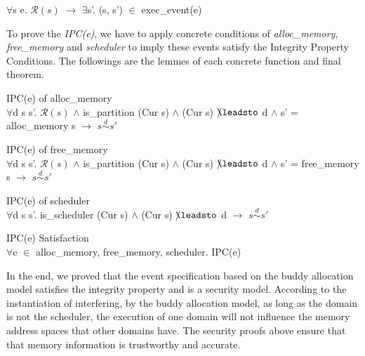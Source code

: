\documentclass[runningheads]{llncs}
\makeatletter
\newcommand{\equidom}[3]{{#1}\stackrel{#2}{\sim}{#3}}
\newcommand{\superimpose}[2]
	{{\ooalign{$#1\@firstoftwo#2$\cr\hfil$#1\@secondoftwo#2$\hfil\cr}}}
\newcommand{\ninterf}{\mathrel{\mathpalette\superimpose{{\slash}{\leadsto}}}}
\makeatother
\begin{document}
\begin{lemma}
$\forall$s e. $\mathcal{R}(s)$ $\longrightarrow$ $\exists$s'. (s, s') $\in$ exec\_event(e)
\end{lemma}

To prove the \emph{IPC(e)}, we have to apply concrete conditions of \emph{alloc\_memory}, \emph{free\_memory} and \emph{scheduler} to imply these events satisfy the Integrity Property Conditions. The followings are the lemmes of each concrete function and final theorem.

\begin{lemma} {IPC(e) of alloc\_memory} \\
$\forall$d s s'. $\mathcal{R}(s)$ $\wedge$ is\_partition (Cur s) $\wedge$ (Cur s) $\ninterf$ d $\wedge$ s' = alloc\_memory s $\longrightarrow$ $\equidom{s}{d}{s'}$
\end{lemma}

\begin{lemma} {IPC(e) of free\_memory} \\
$\forall$d s s'. $\mathcal{R}(s)$ $\wedge$ is\_partition (Cur s) $\wedge$ (Cur s) $\ninterf$ d $\wedge$ s' = free\_memory s $\longrightarrow$ $\equidom{s}{d}{s'}$
\end{lemma}

\begin{lemma} {IPC(e) of scheduler} \\
$\forall$d s s'. is\_scheduler (Cur s) $\wedge$ (Cur s) $\ninterf$ d $\longrightarrow$ $\equidom{s}{d}{s'}$
\end{lemma}

\begin{theorem} {IPC(e) Satisfaction} \\
$\forall$e $\in$ {alloc\_memory, free\_memory, scheduler}. IPC(e)
\end{theorem}

In the end, we proved that the event specification based on the buddy allocation model satisfies the integrity property and is a security model. According to the instantiation of interfering, by the buddy allocation model, as long as the domain is not the scheduler, the execution of one domain will not influence the memory address spaces that other domains have. The security proofs above ensure that that memory information is trustworthy and accurate.
\end{document}
